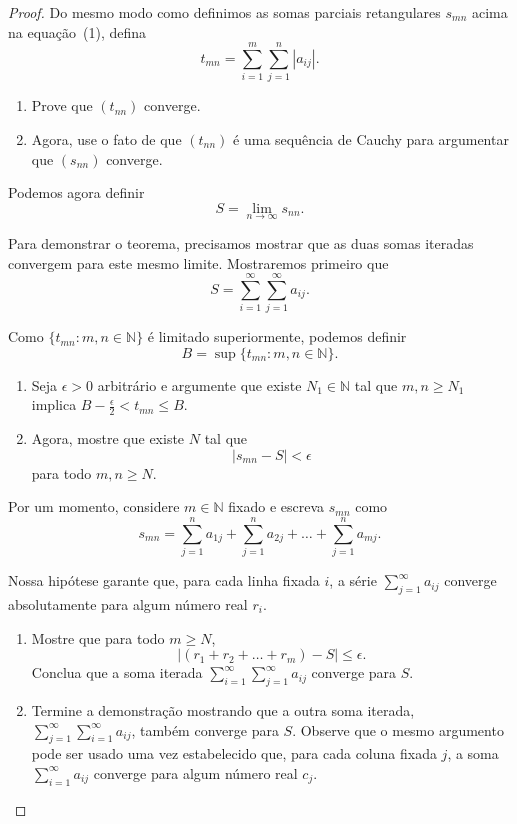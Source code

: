 \begin{proof}
Do mesmo modo como definimos as somas parciais retangulares $s_{mn}$ acima na equação~(1), defina
\[
t_{mn} = \sum_{i=1}^{m} \sum_{j=1}^{n} |a_{ij}|.
\]

\begin{exercise}\label{ex:2-8-3}
\begin{enumerate}[label=\alph*)]
\item Prove que $(t_{nn})$ converge.
\item Agora, use o fato de que $(t_{nn})$ é uma sequência de Cauchy para argumentar que $(s_{nn})$ converge.
\end{enumerate}
\end{exercise}

Podemos agora definir
\[
S = \lim_{n \to \infty} s_{nn}.
\]

Para demonstrar o teorema, precisamos mostrar que as duas somas iteradas convergem para este mesmo limite. Mostraremos primeiro que
\[
S = \sum_{i=1}^{\infty} \sum_{j=1}^{\infty} a_{ij}.
\]

Como $\{t_{mn} : m, n \in \mathbb{N}\}$ é limitado superiormente, podemos definir
\[
B = \sup\{t_{mn} : m, n \in \mathbb{N}\}.
\]

\begin{exercise}\label{ex:2-8-4}
\begin{enumerate}[label=\alph*)]
\item Seja $\epsilon > 0$ arbitrário e argumente que existe $N_1 \in \mathbb{N}$ tal que $m, n \geq N_1$ implica $B - \frac{\epsilon}{2} < t_{mn} \leq B$.
\item Agora, mostre que existe $N$ tal que
\[
|s_{mn} - S| < \epsilon
\]
para todo $m, n \geq N$.
\end{enumerate}
\end{exercise}

Por um momento, considere $m \in \mathbb{N}$ fixado e escreva $s_{mn}$ como
\[
s_{mn} = \sum_{j=1}^{n} a_{1j} + \sum_{j=1}^{n} a_{2j} + \dots + \sum_{j=1}^{n} a_{mj}.
\]

Nossa hipótese garante que, para cada linha fixada $i$, a série $\sum_{j=1}^{\infty} a_{ij}$ converge absolutamente para algum número real $r_i$.

\begin{exercise}\label{ex:2-8-5}
\begin{enumerate}[label=\alph*)]
\item Mostre que para todo $m \geq N$,
\[
|(r_1 + r_2 + \dots + r_m) - S| \leq \epsilon.
\]
Conclua que a soma iterada $\sum_{i=1}^{\infty} \sum_{j=1}^{\infty} a_{ij}$ converge para $S$.
\item Termine a demonstração mostrando que a outra soma iterada, $\sum_{j=1}^{\infty} \sum_{i=1}^{\infty} a_{ij}$, também converge para $S$. Observe que o mesmo argumento pode ser usado uma vez estabelecido que, para cada coluna fixada $j$, a soma $\sum_{i=1}^{\infty} a_{ij}$ converge para algum número real $c_j$.
\end{enumerate}
\end{exercise}
\end{proof}

